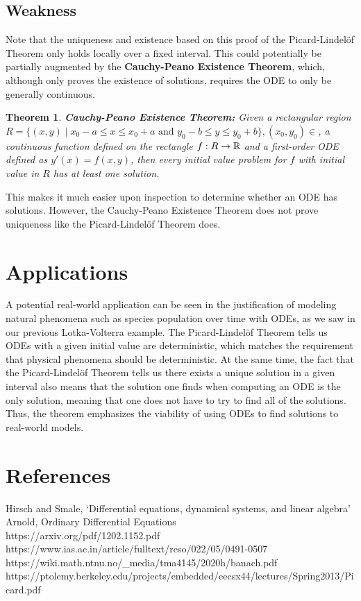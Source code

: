 \documentclass{article}
\newtheorem{theorem}{Theorem}[section]
\theoremstyle{remark}
\begin{document}
\subsection{Weakness} 
Note that the uniqueness and existence based on this proof of the Picard-Lindelöf Theorem only holds locally over a fixed interval. This could potentially be partially augmented by the \textbf{Cauchy-Peano Existence Theorem}, which, although only proves the existence of solutions, requires the ODE to only be generally continuous. 
\begin{theorem} \textbf{Cauchy-Peano Existence Theorem:}
    Given a rectangular region $R = \{(x,y)\mid x_0-a\leq x \leq x_0+a \text{ and } y_0-b\leq y\leq y_0+b\}, (x_0, y_0) \in $, a continuous function defined on the rectangle $f: R \to \Bbb R$ and a first-order ODE defined as $y'(x) = f(x,y)$, then every initial value problem for $f$  with initial value in $R$ has at least one solution.
\end{theorem}


This makes it much easier upon inspection to determine whether an ODE has solutions. However, the Cauchy-Peano Existence Theorem does not prove uniqueness like the Picard-Lindelöf Theorem does.



\section{Applications}
A potential real-world application can be seen in the justification of modeling natural phenomena such as species population over time with ODEs, as we saw in  our previous Lotka-Volterra example. The Picard-Lindelöf Theorem tells us ODEs with a given initial value are deterministic, which matches the requirement that physical phenomena should be deterministic. At the same time, the fact that the Picard-Lindelöf Theorem tells us there exists a unique solution in a given interval also means that the solution one finds when computing an ODE is the only solution, meaning that one does not have to try to find all of the solutions. Thus, the theorem emphasizes the viability of using ODEs to find solutions to real-world models.


\section{References}
Hirsch and Smale, ‘Differential equations, dynamical systems, and linear algebra’ \\ 
Arnold, Ordinary Differential Equations \\ 
https://arxiv.org/pdf/1202.1152.pdf \\
https://www.ias.ac.in/article/fulltext/reso/022/05/0491-0507 \\ 
https://wiki.math.ntnu.no/\_media/tma4145/2020h/banach.pdf \\ 
https://ptolemy.berkeley.edu/projects/embedded/eecsx44/lectures/Spring2013/Picard.pdf\\
\end{document}
